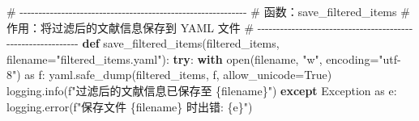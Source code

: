 \documentclass[
  letterpaper,
  DIV=11,
  numbers=noendperiod]{scrreprt}
\newenvironment{Shaded}{\begin{snugshade}}{\end{snugshade}}
\newcommand{\BuiltInTok}[1]{\textcolor[rgb]{0.00,0.23,0.31}{#1}}
\newcommand{\CommentTok}[1]{\textcolor[rgb]{0.37,0.37,0.37}{#1}}
\newcommand{\ControlFlowTok}[1]{\textcolor[rgb]{0.00,0.23,0.31}{\textbf{#1}}}
\newcommand{\ImportTok}[1]{\textcolor[rgb]{0.00,0.46,0.62}{#1}}
\newcommand{\KeywordTok}[1]{\textcolor[rgb]{0.00,0.23,0.31}{\textbf{#1}}}
\newcommand{\NormalTok}[1]{\textcolor[rgb]{0.00,0.23,0.31}{#1}}
\newcommand{\OperatorTok}[1]{\textcolor[rgb]{0.37,0.37,0.37}{#1}}
\newcommand{\PreprocessorTok}[1]{\textcolor[rgb]{0.68,0.00,0.00}{#1}}
\newcommand{\SpecialCharTok}[1]{\textcolor[rgb]{0.37,0.37,0.37}{#1}}
\newcommand{\SpecialStringTok}[1]{\textcolor[rgb]{0.13,0.47,0.30}{#1}}
\newcommand{\StringTok}[1]{\textcolor[rgb]{0.13,0.47,0.30}{#1}}
\newcommand{\VariableTok}[1]{\textcolor[rgb]{0.07,0.07,0.07}{#1}}
\begin{document}
\begin{Shaded}
\begin{Highlighting}[]

\CommentTok{\# {-}{-}{-}{-}{-}{-}{-}{-}{-}{-}{-}{-}{-}{-}{-}{-}{-}{-}{-}{-}{-}{-}{-}{-}{-}{-}{-}{-}{-}{-}{-}{-}{-}{-}{-}{-}{-}{-}{-}{-}{-}{-}{-}{-}{-}{-}{-}{-}{-}{-}{-}{-}{-}{-}{-}{-}{-}{-}{-}{-}}
\CommentTok{\# 函数：save\_filtered\_items}
\CommentTok{\# 作用：将过滤后的文献信息保存到 YAML 文件}
\CommentTok{\# {-}{-}{-}{-}{-}{-}{-}{-}{-}{-}{-}{-}{-}{-}{-}{-}{-}{-}{-}{-}{-}{-}{-}{-}{-}{-}{-}{-}{-}{-}{-}{-}{-}{-}{-}{-}{-}{-}{-}{-}{-}{-}{-}{-}{-}{-}{-}{-}{-}{-}{-}{-}{-}{-}{-}{-}{-}{-}{-}{-}}
\KeywordTok{def}\NormalTok{ save\_filtered\_items(filtered\_items, filename}\OperatorTok{=}\StringTok{"filtered\_items.yaml"}\NormalTok{):}
    \ControlFlowTok{try}\NormalTok{:}
        \ControlFlowTok{with} \BuiltInTok{open}\NormalTok{(filename, }\StringTok{"w"}\NormalTok{, encoding}\OperatorTok{=}\StringTok{"utf{-}8"}\NormalTok{) }\ImportTok{as}\NormalTok{ f:}
\NormalTok{            yaml.safe\_dump(filtered\_items, f, allow\_unicode}\OperatorTok{=}\VariableTok{True}\NormalTok{)}
\NormalTok{        logging.info(}\SpecialStringTok{f"过滤后的文献信息已保存至 }\SpecialCharTok{\{}\NormalTok{filename}\SpecialCharTok{\}}\SpecialStringTok{"}\NormalTok{)}
    \ControlFlowTok{except} \PreprocessorTok{Exception} \ImportTok{as}\NormalTok{ e:}
\NormalTok{        logging.error(}\SpecialStringTok{f"保存文件 }\SpecialCharTok{\{}\NormalTok{filename}\SpecialCharTok{\}}\SpecialStringTok{ 时出错: }\SpecialCharTok{\{}\NormalTok{e}\SpecialCharTok{\}}\SpecialStringTok{"}\NormalTok{)}


\end{Highlighting}
\end{Shaded}
\end{document}
